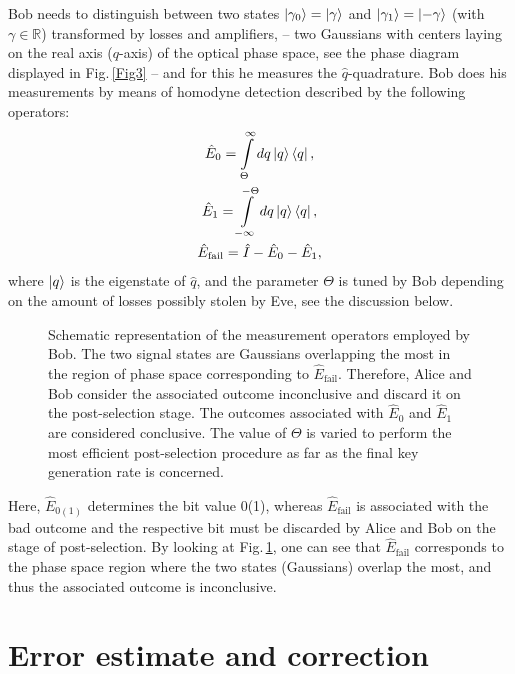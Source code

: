 \documentclass[a4paper]{article}
\begin{document}
Bob needs to distinguish between two states $\ket{\gamma_0}=\ket{\gamma}$ and $\ket{\gamma_1}=\ket{-\gamma}$ (with $\gamma\in\mathds{R}$) transformed by losses and amplifiers, -- two Gaussians with centers laying on the real axis ($q$-axis) of the optical phase space, see the phase diagram displayed in Fig.\,\ref{Fig3} -- and for this he measures the $\hat{q}$-quadrature.
Bob does his measurements by means of homodyne detection described by the following operators:
%
\begin{equation}
    \begin{gathered}
        \hat{E}_0 = \int\limits^{\infty}_{\Theta} d q \ket{q}\bra{q},\\
        \hat{E}_1 = \int\limits^{-\Theta}_{-\infty} d q \ket{q}\bra{q},\\
        \hat{E}_\text{fail} = \hat{I} - \hat{E}_0 - \hat{E}_1,
    \end{gathered}
\end{equation}
%
where $\ket{q}$ is the eigenstate of $\hat{q}$, and the parameter $\Theta$ is tuned by Bob depending on the amount of losses possibly stolen by Eve, see the discussion below. 
%
\begin{figure}[t]
    \noindent{}
    \caption{
    Schematic representation of the measurement operators employed by Bob.
    The two signal states are Gaussians overlapping the most in the region of phase space corresponding to $\hat{E}_\text{fail}$.
    Therefore, Alice and Bob consider the associated outcome inconclusive and discard it on the post-selection stage. 
    The outcomes associated with $\hat{E}_0$ and $\hat{E}_1$ are considered conclusive.
    The value of $\Theta$ is varied to perform the most efficient post-selection procedure as far as the final key generation rate is concerned.
    } 
    \label{Fig4}
\end{figure}
%
Here, $\hat{E}_{0(1)}$ determines the bit value 0(1), whereas $\hat{E}_\text{fail}$ is associated with the bad outcome and the respective bit must be discarded by Alice and Bob on the stage of post-selection. 
By looking at Fig.\,\ref{Fig4}, one can see that $\hat{E}_\text{fail}$ corresponds to the phase space region where the two states (Gaussians) overlap the most, and thus the associated outcome is inconclusive.

\section{Error estimate and correction}
\end{document}
